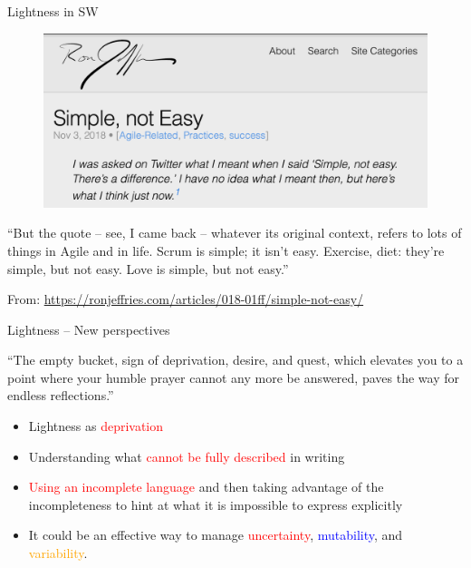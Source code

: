\documentclass{beamer}
\begin{document}
\begin{frame}
{\centerline{Lightness in SW}}

\begin{figure}[htp]
    \centering
     \includegraphics[width=.85\textwidth]{P2023.AIBCCSS.StoryTelling/EasyChangeJeffries.png}
    \label{F:EasyChangeJeffries}
\end{figure}
\vspace{-0.4cm}
\begin{tcolorbox}[colback=gray!5,colframe=gray!5]
\small
``But the quote – see, I came back – whatever its original context, refers to lots of things in Agile and in life. Scrum is simple; it isn’t easy. Exercise, diet: they’re simple, but not easy. Love is simple, but not easy.''
\begin{center}
    \tiny{From:  \url{https://ronjeffries.com/articles/018-01ff/simple-not-easy/}}
\end{center}
\end{tcolorbox}

\end{frame}


\begin{frame}
{\centerline{Lightness -- New perspectives}}

\begin{tcolorbox}[colback=yellow!5,colframe=yellow!40!black]
``The empty bucket, sign of deprivation, desire, and quest, which elevates you to a point where your humble prayer cannot any more be answered, paves the way for endless reflections.''
\end{tcolorbox}

\begin{itemize}
\item Lightness as \textcolor{red}{deprivation}
\item Understanding what \textcolor{red}{cannot be fully described} in writing
\item \textcolor{red}{Using an incomplete language} and then taking advantage of the incompleteness to hint at what it is impossible to express explicitly 
\item It could be an effective way to manage \textcolor{red}{uncertainty}, \textcolor{blue}{mutability}, and \textcolor{orange}{variability}.
\end{itemize}

\end{frame}
\end{document}
